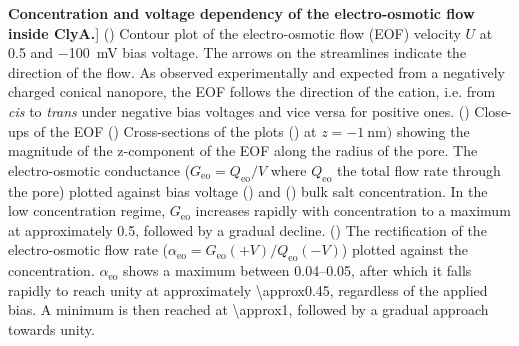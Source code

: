 \begin{figure*}[htbp]
\caption
[\textbf{Concentration and voltage dependency of the electro-osmotic flow inside ClyA.}]
{
() Contour plot of the electro-osmotic flow (EOF) velocity $U$ at \SI{0.5}{\Molar} 
and \SI{-100}{\milli\volt} bias voltage. The arrows on the streamlines indicate the direction of the flow. As 
observed experimentally\cite{} and expected from a negatively charged conical nanopore, the EOF follows the 
direction of the cation, i.e. from \textit{cis} to \textit{trans} under negative bias voltages and vice versa 
for positive ones.
()
Close-ups of the EOF 
()
Cross-sections of the plots () at $z=\SI{-1}{\nano\meter})$ showing the 
magnitude of the z-component of the EOF along the radius of the pore.
The electro-osmotic conductance ($G_\text{eo} = Q_\text{eo}/V$ where $Q_\text{eo}$ the total flow rate through
the pore) plotted against bias voltage () and 
() bulk salt concentration. In the low concentration regime, 
$G_\text{eo}$ increases rapidly with concentration to a maximum at approximately \SI{0.5}{\Molar}, followed 
by a gradual decline.
()
The rectification of the electro-osmotic flow rate ($\alpha_\text{eo} = G_\text{eo}(+V)/Q_\text{eo}(-V)$) 
plotted against the concentration.
$\alpha_\text{eo}$ shows a maximum between \SIrange{0.04}{0.05}{\Molar}, after which it falls rapidly to 
reach unity at approximately \SI{\approx0.45}{\Molar}, regardless of the applied bias.
A minimum is then reached at \SI{\approx1}{\Molar}, followed by a gradual approach towards unity.
}

\label{fig:electro-osmotic_flow}

\end{figure*}